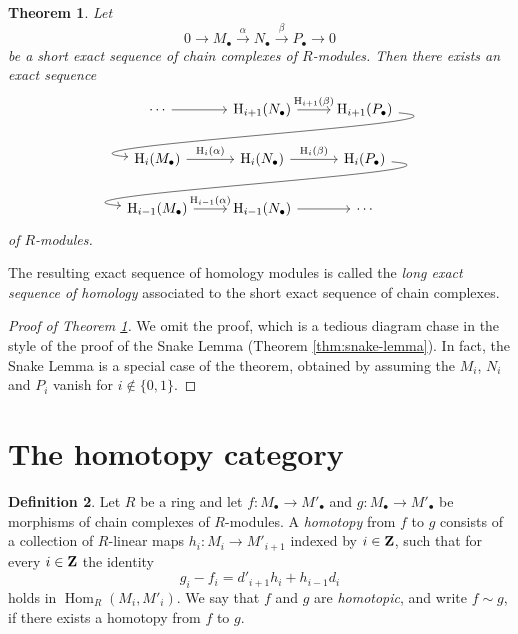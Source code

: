 \documentclass[11pt]{amsbook}
\newcommand{\longto}{\longrightarrow}
\DeclareMathOperator\Hom{Hom}
\def\rH{{\mathrm H}} \def\rK{{\mathrm K}} \def\rR{{\mathrm R}}
\theoremstyle{plain}
\newtheorem{theorem}{Theorem}
\theoremstyle{definition}
\newtheorem{definition}[theorem]{Definition}
\begin{document}
\begin{theorem}\label{thm:long-exact-sequence}
Let 
\[
	0 \longto M_\bullet \overset{\alpha}{\longto} N_\bullet 
	\overset{\beta}{\longto} P_\bullet \longto 0
\]
be a short exact sequence of chain complexes of $R$-modules. Then there exists
an exact sequence
\[
\begin{tikzcd}
 	\cdots \arrow{r}
 	& \rH_{i+1}(N_\bullet) \arrow{r}{\rH_{i+1}(\beta)}
 	& \rH_{i+1}(P_\bullet) \arrow[out=-5, in=175]{dll} \\
 	\rH_{i}(M_\bullet) \arrow{r}{\rH_{i}(\alpha)}
 	& \rH_{i}(N_\bullet) \arrow{r}{\rH_{i}(\beta)}
 	& \rH_{i}(P_\bullet) \arrow[out=-5, in=175]{dll} \\
 	\rH_{i-1}(M_\bullet) \arrow{r}{\rH_{i-1}(\alpha)}
 	& \rH_{i-1}(N_\bullet) \arrow{r}
 	& \cdots 
\end{tikzcd}
\]
of $R$-modules.
\end{theorem}

The resulting exact sequence of homology modules is called the \emph{long exact sequence of homology} associated to the short exact sequence of chain complexes.

\begin{proof}[Proof of Theorem \ref{thm:long-exact-sequence}]
We omit the proof, which is a tedious diagram chase in the style of the proof of the Snake Lemma (Theorem \ref{thm:snake-lemma}). In fact, the Snake Lemma is a special case of the theorem, obtained by assuming the $M_i$, $N_i$ and $P_i$ vanish for $i\not\in \{0,1\}$.
\end{proof}

\section{The homotopy category}

\begin{definition}
Let $R$ be a ring and let $f\colon M_\bullet \to M'_\bullet$ and $g\colon M_\bullet \to M'_\bullet$ be morphisms of chain complexes of $R$-modules. A \emph{homotopy} from $f$ to $g$ consists of
a collection of $R$-linear maps $h_i\colon M_i \to M'_{i+1}$ indexed by $i\in {\mathbf{Z}}$, such that for every $i\in {\mathbf{Z}}$ the identity
\[
	g_i - f_i =  d'_{i+1} h_i + h_{i-1} d_i
\]
holds in $\Hom_R( M_i, M'_i )$. We say that $f$ and $g$ are \emph{homotopic}, and write $f\sim g$, if there exists a homotopy from $f$ to $g$. 
\end{definition}
\end{document}
